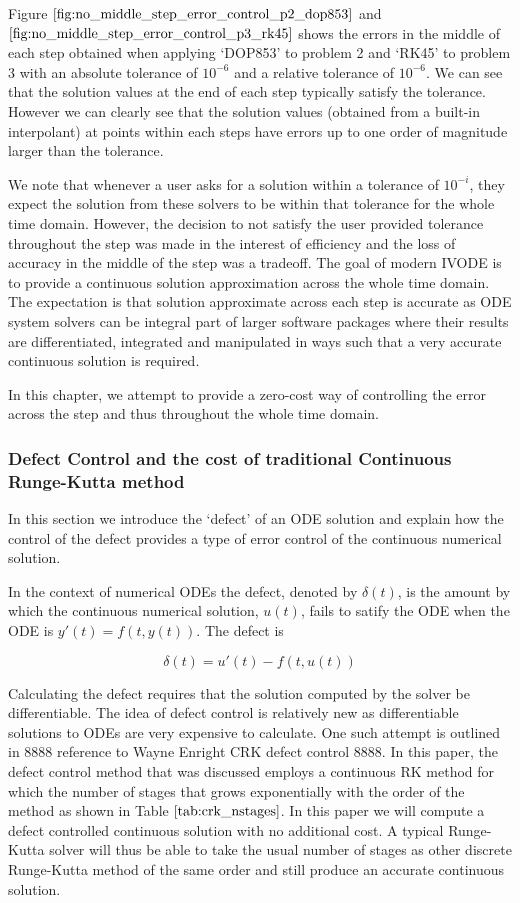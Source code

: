 \documentclass{article}
\begin{document}
Figure $\ref{fig:no_middle_step_error_control_p2_dop853}$ and $\ref{fig:no_middle_step_error_control_p3_rk45}$ shows the errors in the middle of each step obtained when applying `DOP853' to problem 2 and `RK45' to problem 3 with an absolute tolerance of $10^{-6}$ and a relative tolerance of $10^{-6}$. We can see that the solution values at the end of each step typically satisfy the tolerance. However we can clearly see that the solution values (obtained from a built-in interpolant) at points within each steps have errors up to one order of magnitude larger than the tolerance. 

We note that whenever a user asks for a solution within a tolerance of $10^{-i}$, they expect the solution from these solvers to be within that tolerance for the whole time domain. However, the decision to not satisfy the user provided tolerance throughout the step was made in the interest of efficiency and the loss of accuracy in the middle of the step was a tradeoff. The goal of modern IVODE is to provide a continuous solution approximation across the whole time domain. The expectation is that solution approximate across each step is accurate as ODE system solvers can be integral part of larger software packages where their results are differentiated, integrated and manipulated in ways such that a very accurate continuous solution is required. 

In this chapter, we attempt to provide a zero-cost way of controlling the error across the step and thus throughout the whole time domain.

\subsubsection{Defect Control and the cost of traditional Continuous Runge-Kutta method}
\label{section:crk_related_work}
In this section we introduce the `defect' of an ODE solution and explain how the control of the defect provides a type of error control of the continuous numerical solution.

In the context of numerical ODEs the defect, denoted by $\delta(t)$,  is the amount by which the continuous numerical solution, $u(t)$, fails to satify the ODE when the ODE is $y'(t) = f(t, y(t))$. The defect is 

\begin{equation}
\delta(t) = u'(t) - f(t, u(t))
\end{equation}

Calculating the defect requires that the solution computed by the solver be differentiable. The idea of defect control is relatively new as differentiable solutions to ODEs are very expensive to calculate. One such attempt is outlined in 8888 reference to Wayne Enright CRK defect control 8888. In this paper, the defect control method that was discussed employs a continuous RK method for which the number of stages that grows exponentially with the order of the method as shown in Table $\ref{tab:crk_nstages}$. In this paper we will compute a defect controlled continuous solution with no additional cost. A typical Runge-Kutta solver will thus be able to take the usual number of stages as other discrete Runge-Kutta method of the same order and still produce an accurate continuous solution.
\end{document}
